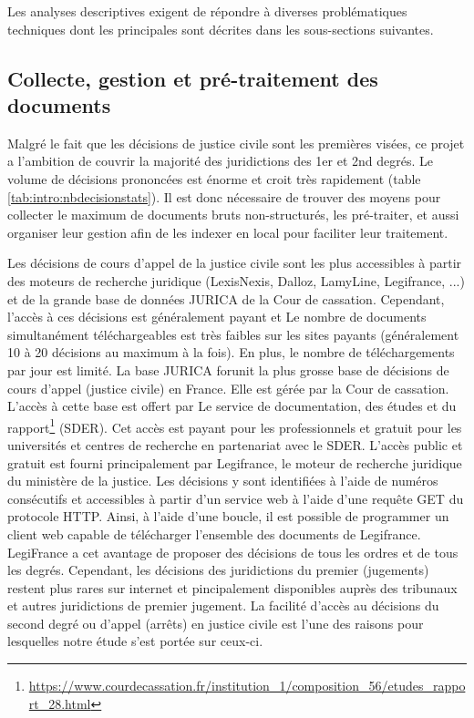 Les analyses descriptives exigent de répondre à diverses problématiques techniques dont les principales sont décrites dans les sous-sections suivantes. 

\subsection{Collecte, gestion et pré-traitement des documents}

Malgré le fait que les décisions de justice civile sont les premières visées, ce projet a l'ambition de couvrir la majorité des juridictions des 1er et 2nd degrés. Le volume de décisions prononcées est énorme et croit très rapidement (table \ref{tab:intro:nbdecisionstats}). Il est donc nécessaire de trouver des moyens pour collecter le maximum de documents bruts non-structurés, les pré-traiter, et aussi organiser leur gestion afin de les indexer en local pour faciliter leur traitement.

Les décisions de cours d'appel de la justice civile sont les plus accessibles à partir des moteurs de recherche juridique (LexisNexis, 
Dalloz, LamyLine, Legifrance, ...) et de la grande base de données JURICA de la Cour de cassation. Cependant, l'accès à ces décisions est généralement payant et Le nombre de documents simultanément téléchargeables est très faibles sur les sites payants (généralement 10 à 20 décisions au maximum à la fois). En plus, le nombre de téléchargements par jour est limité. La base JURICA forunit la plus grosse base de décisions de cours d'appel (justice civile) en France. Elle est gérée par la Cour de cassation. L'accès à cette base est offert par Le service de documentation, des études et du rapport\footnote{\url{https://www.courdecassation.fr/institution_1/composition_56/etudes_rapport_28.html}} (SDER). Cet accès est payant pour les professionnels et gratuit pour les universités et centres de recherche en partenariat avec le SDER. L'accès public et gratuit est fourni principalement par Legifrance, le moteur de recherche juridique du ministère de la justice. Les décisions y sont identifiées à l'aide de numéros consécutifs et accessibles à partir d'un service web à l'aide d'une requête GET du protocole HTTP. Ainsi, à l'aide d'une boucle, il est possible de programmer un client web capable de télécharger l'ensemble des documents de Legifrance. LegiFrance a cet avantage de proposer des décisions de tous les ordres et de tous les degrés. Cependant, les décisions des juridictions du premier (jugements) restent plus rares sur internet et pincipalement disponibles auprès des tribunaux et autres juridictions de premier jugement.  La facilité d'accès au décisions du second degré ou d'appel (arrêts) en justice civile est l'une des raisons pour lesquelles notre étude s'est portée sur ceux-ci.


